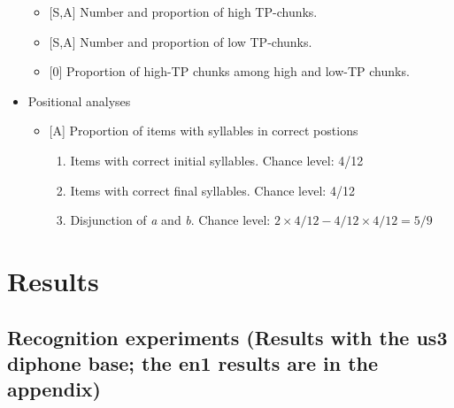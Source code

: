 \documentclass[]{article}
\providecommand{\tightlist}{%
  \setlength{\itemsep}{0pt}\setlength{\parskip}{0pt}}
\begin{document}
\begin{itemize}
  \begin{itemize}
  \tightlist
  \item
    {[}S,A{]} Number and proportion of high TP-chunks.
  \item
    {[}S,A{]} Number and proportion of low TP-chunks.
  \item
    {[}0{]} Proportion of high-TP chunks among high and low-TP chunks.
  \end{itemize}
\item
  Positional analyses

  \begin{itemize}
  \tightlist
  \item
    {[}A{]} Proportion of items with syllables in correct postions

    \begin{enumerate}
    \def\labelenumi{\alph{enumi}.}
    \tightlist
    \item
      Items with correct initial syllables. Chance level: 4/12
    \item
      Items with correct final syllables. Chance level: 4/12
    \item
      Disjunction of \emph{a} and \emph{b}. Chance level:
      \(2 \times 4/12 - 4/12 \times 4/12 = 5/9\)
    \end{enumerate}
  \end{itemize}
\end{itemize}

\clearpage

\section{Results}\label{results}

\subsection{Recognition experiments (Results with the us3 diphone base;
the en1 results are in the
appendix)}\label{recognition-experiments-results-with-the-us3-diphone-base-the-en1-results-are-in-the-appendix}
\end{document}
